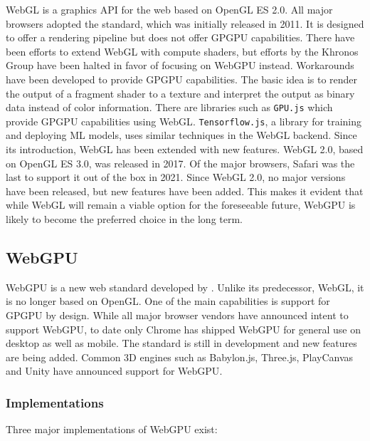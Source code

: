 \gls{WebGL} is a graphics \gls{API} for the web based on \gls{OpenGL ES} 2.0. All major browsers adopted the standard, which was initially released in 2011. It is designed to offer a rendering pipeline but does not offer \gls{GPGPU} capabilities. There have been efforts to extend \gls{WebGL} with compute shaders, but efforts by the \gls{Khronos Group} have been halted in favor of focusing on \gls{WebGPU} instead. Workarounds have been developed to provide \gls{GPGPU} capabilities. The basic idea is to render the output of a fragment shader to a texture and interpret the output as binary data instead of color information. There are libraries such as \texttt{GPU.js} which provide \gls{GPGPU} capabilities using \gls{WebGL}. \texttt{Tensorflow.js}, a library for training and deploying \gls{ML} models, uses similar techniques in the \gls{WebGL} backend. Since its introduction, \gls{WebGL} has been extended with new features. \gls{WebGL} 2.0, based on \gls{OpenGL ES} 3.0, was released in 2017. Of the major browsers, Safari was the last to support it out of the box in 2021. Since \gls{WebGL} 2.0, no major versions have been released, but new features have been added. This makes it evident that while \gls{WebGL} will remain a viable option for the foreseeable future, \gls{WebGPU} is likely to become the preferred choice in the long term.

\subsection*{WebGPU}

\gls{WebGPU} is a new web standard developed by  \cite{webgpuSpecification}. Unlike its predecessor, \gls{WebGL}, it is no longer based on \gls{OpenGL}. One of the main capabilities is support for \gls{GPGPU} by design. While all major browser vendors have announced intent to support \gls{WebGPU}, to date only Chrome has shipped \gls{WebGPU} for general use on desktop as well as mobile.
The standard is still in development and new features are being added.
Common 3D engines such as \gls{Babylon.js}, \gls{Three.js}, \gls{PlayCanvas} and \gls{Unity} have announced support for \gls{WebGPU}.

\subsubsection{Implementations}

Three major implementations of \gls{WebGPU} exist:

